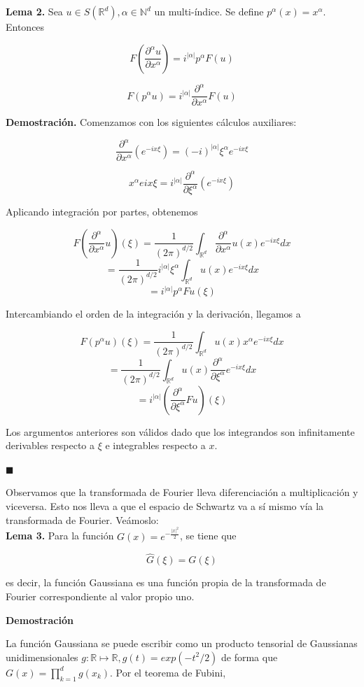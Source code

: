 \begin{itemize}
\textbf{Lema 2.} Sea $u \in S(\mathbb{R}^d), \alpha \in \mathbb{N}^d$ un multi-índice. Se define $p^\alpha(x) = x^\alpha$. Entonces

$$F(\frac{\partial^\alpha u}{\partial x^\alpha}) = i^{|\alpha|}p^\alpha F(u)$$

$$F(p^\alpha u) = i^{|\alpha|} \frac{\partial^\alpha }{\partial x^\alpha} F(u)$$

\textbf{Demostración.}
	Comenzamos con los siguientes cálculos auxiliares:
	
	$$\frac{\partial^\alpha }{\partial x^\alpha} (e^{-ix\xi}) = (-i)^{|\alpha|} \xi^\alpha e^{-ix\xi}$$
	
	$$x^\alpha e{ix\xi} = i^{|\alpha|}\frac{\partial^\alpha}{\partial \xi^\alpha}(e^{-ix\xi})$$
	
	Aplicando integración por partes, obtenemos
	
	$$F(\frac{\partial^\alpha}{\partial x^\alpha}u)(\xi) = \frac{1}{(2\pi)^{d/2}}\int_{\mathbb{R}^d} \frac{\partial^\alpha}{\partial x^\alpha} u(x) e^{-ix\xi}dx$$
	$$= \frac{1}{(2\pi)^{d/2}} i^{|\alpha|}\xi^\alpha \int_{\mathbb{R}^d} u(x) e^{-ix\xi}dx$$
	$$=i^{|\alpha|} p^\alpha Fu(\xi)$$
	
Intercambiando el orden de la integración y la derivación, llegamos a

$$F(p^\alpha u)(\xi) = \frac{1}{(2\pi)^{d/2}}\int_{\mathbb{R}^d} u(x)x^\alpha e^{-ix\xi}dx$$
$$=\frac{1}{(2\pi)^{d/2}}\int_{\mathbb{R}^d} u(x)\frac{\partial^\alpha}{\partial \xi^\alpha}e^{-ix\xi}dx$$
$$=i^{|\alpha|}(\frac{\partial^\alpha}{\partial \xi^\alpha}Fu)(\xi)$$

Los argumentos anteriores son válidos dado que los integrandos son infinitamente derivables respecto a $\xi$ e integrables respecto a $x$.

\hfill$\blacksquare$

Observamos que la transformada de Fourier lleva diferenciación a multiplicación y viceversa. Esto nos lleva a que el espacio de Schwartz va a sí mismo vía la transformada de Fourier. Veámoslo:\\

\textbf{Lema 3.} Para la función $G(x) = e^{-\frac{|x|^2}{2}}$, se tiene que 

$$\hat{G}(\xi) = G(\xi)$$

es decir, la función Gaussiana es una función propia de la transformada de Fourier correspondiente al valor propio uno.

\textbf{Demostración}

La función Gaussiana se puede escribir como un producto tensorial de Gaussianas unidimensionales $g:\mathbb{R} \mapsto \mathbb{R}, g(t) = exp(-t^2/2)$ de forma que $G(x) = \prod_{k=1}^{d} g(x_k)$. Por el teorema de Fubini,


\end{itemize}
